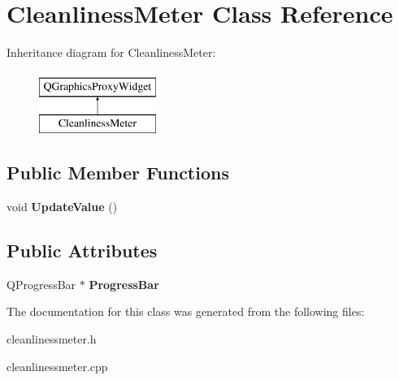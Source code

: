\hypertarget{classCleanlinessMeter}{\section{Cleanliness\-Meter Class Reference}
\label{classCleanlinessMeter}
}
Inheritance diagram for Cleanliness\-Meter\-:\begin{figure}[H]
\begin{center}
\leavevmode
\includegraphics[height=2.000000cm]{classCleanlinessMeter}
\end{center}
\end{figure}
\subsection*{Public Member Functions}
\begin{DoxyCompactItemize}
\item 
\hypertarget{classCleanlinessMeter_aa6c6dbca9a896e45b2b79ce4065f5276}{void {\bfseries Update\-Value} ()}\label{classCleanlinessMeter_aa6c6dbca9a896e45b2b79ce4065f5276}

\end{DoxyCompactItemize}
\subsection*{Public Attributes}
\begin{DoxyCompactItemize}
\item 
\hypertarget{classCleanlinessMeter_a4e0c38787ca511a4041547a32504d93a}{Q\-Progress\-Bar $\ast$ {\bfseries Progress\-Bar}}\label{classCleanlinessMeter_a4e0c38787ca511a4041547a32504d93a}

\end{DoxyCompactItemize}


The documentation for this class was generated from the following files\-:\begin{DoxyCompactItemize}
\item 
cleanlinessmeter.\-h\item 
cleanlinessmeter.\-cpp\end{DoxyCompactItemize}
